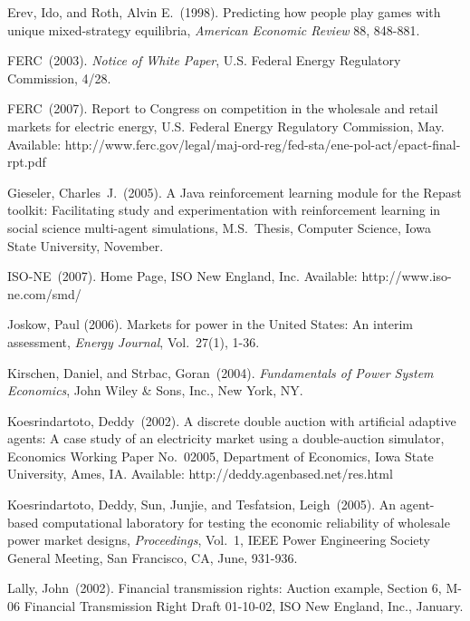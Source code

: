 \documentclass[12pt]{article}
\begin{document}
\begin{description}
\item Erev, Ido, and Roth, Alvin E.~(1998).  Predicting how people play games with unique
mixed-strategy equilibria, {\it American Economic Review\/} 88, 848-881.

\item FERC~(2003). {\it Notice of White Paper\/}, U.S. Federal Energy Regulatory
Commission, 4/28.

\item FERC~(2007). Report to Congress on competition in the wholesale and retail markets for electric energy, 
U.S. Federal Energy Regulatory Commission, May.  Available:
http://www.ferc.gov/legal/maj-ord-reg/fed-sta/ene-pol-act/epact-final-rpt.pdf

\item Gieseler, Charles~J.~(2005).  A Java reinforcement learning module for the Repast toolkit:
Facilitating study and experimentation with reinforcement learning in social science multi-agent
simulations, M.S.\ Thesis, Computer Science, Iowa
State University, November.

\item ISO-NE~(2007). Home Page, ISO New England, Inc. 
Available: http://www.iso-ne.com/smd/

\item Joskow, Paul (2006).  Markets for power in the United States: An interim assessment, \textit{Energy Journal\/}, 
Vol.\ 27(1), 1-36.

\item
Kirschen, Daniel, and Strbac, Goran~(2004). \textit{Fundamentals of Power System Economics\/}, 
John Wiley \& Sons, Inc., New York, NY.

\item
Koesrindartoto, Deddy~(2002).  A discrete double auction with artificial adaptive
agents:  A case study of an electricity market using a double-auction
simulator, Economics Working Paper No.~02005, Department of Economics, Iowa
State University, Ames, IA.  Available: http://deddy.agenbased.net/res.html

\item Koesrindartoto, Deddy, Sun, Junjie, and Tesfatsion, Leigh~(2005).  An agent-based computational
laboratory for testing the economic reliability of wholesale power market designs, 
{\it Proceedings\/}, Vol.~1, IEEE Power Engineering Society General Meeting, San Francisco, CA,
June, 931-936.

\item Lally, John~(2002). Financial transmission rights: Auction example, Section 6, M-06 
Financial Transmission Right Draft 01-10-02, ISO New England, Inc., January.


\end{description}
\end{document}
